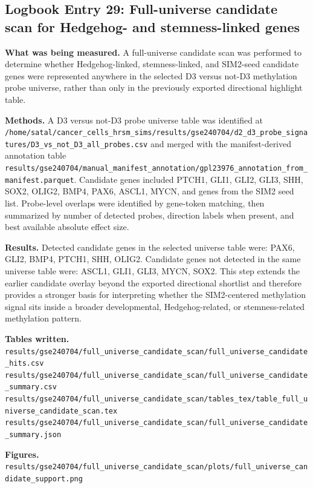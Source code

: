 \subsection*{Logbook Entry 29: Full-universe candidate scan for Hedgehog- and stemness-linked genes}

\textbf{What was being measured.}
A full-universe candidate scan was performed to determine whether Hedgehog-linked, stemness-linked, and SIM2-seed candidate genes were represented anywhere in the selected D3 versus not-D3 methylation probe universe, rather than only in the previously exported directional highlight table.

\textbf{Methods.}
A D3 versus not-D3 probe universe table was identified at
\texttt{/home/satal/cancer\_cells\_hrsm\_sims/results/gse240704/d2\_d3\_probe\_signatures/D3\_vs\_not\_D3\_all\_probes.csv}
and merged with the manifest-derived annotation table
\texttt{results/gse240704/manual\_manifest\_annotation/gpl23976\_annotation\_from\_manifest.parquet}.
Candidate genes included PTCH1, GLI1, GLI2, GLI3, SHH, SOX2, OLIG2, BMP4, PAX6, ASCL1, MYCN, and genes from the SIM2 seed list. Probe-level overlaps were identified by gene-token matching, then summarized by number of detected probes, direction labels when present, and best available absolute effect size.

\textbf{Results.}
Detected candidate genes in the selected universe table were: PAX6, GLI2, BMP4, PTCH1, SHH, OLIG2.
Candidate genes not detected in the same universe table were: ASCL1, GLI1, GLI3, MYCN, SOX2.
This step extends the earlier candidate overlay beyond the exported directional shortlist and therefore provides a stronger basis for interpreting whether the SIM2-centered methylation signal sits inside a broader developmental, Hedgehog-related, or stemness-related methylation pattern.

\textbf{Tables written.}
\texttt{results/gse240704/full\_universe\_candidate\_scan/full\_universe\_candidate\_hits.csv}\\
\texttt{results/gse240704/full\_universe\_candidate\_scan/full\_universe\_candidate\_summary.csv}\\
\texttt{results/gse240704/full\_universe\_candidate\_scan/tables\_tex/table\_full\_universe\_candidate\_scan.tex}\\
\texttt{results/gse240704/full\_universe\_candidate\_scan/full\_universe\_candidate\_summary.json}

\textbf{Figures.}
\texttt{results/gse240704/full\_universe\_candidate\_scan/plots/full\_universe\_candidate\_support.png}

